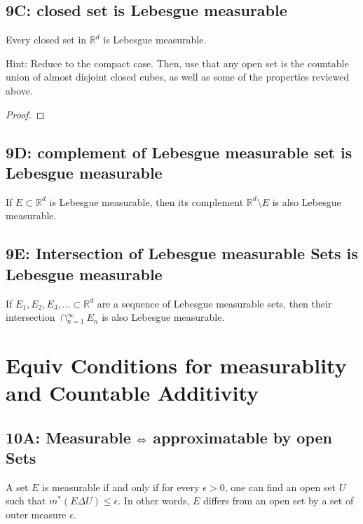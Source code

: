 \documentclass[lang=cn,11pt]{template}
\begin{document}
\section*{9C: closed set is Lebesgue measurable}
\begin{theorem}
Every closed set in \( \mathbb{R}^d \) is Lebesgue measurable.
\end{theorem}
Hint: Reduce to the compact case. Then, use that any open set is the countable union of almost disjoint closed cubes, as well as some of the properties reviewed above.
\begin{proof}

    
\end{proof}


\section*{9D: complement of Lebesgue measurable set is Lebesgue measurable} 
\begin{theorem}
If \( E \subset \mathbb{R}^d \) is Lebesgue measurable, then its complement \( \mathbb{R}^d \setminus E \) is also Lebesgue measurable.
\end{theorem}


\section*{9E: Intersection of Lebesgue measurable Sets is Lebesgue measurable}
\begin{theorem}
If \( E_1, E_2, E_3, \ldots \subset \mathbb{R}^d \) are a sequence of Lebesgue measurable sets, then their intersection \( \cap_{n=1}^{\infty} E_n \) is also Lebesgue measurable.
\end{theorem}




\chapter{Equiv Conditions for measurablity and Countable Additivity}

\section*{10A: Measurable $\Leftrightarrow$ approximatable by open Sets}
A set \( E \) is measurable if and only if for every \( \epsilon > 0 \), one can find an open set \( U \) such that \( m^*(E \Delta U) \leq \epsilon \). In other words, \( E \) differs from an open set by a set of outer measure \( \epsilon \).
\end{document}
